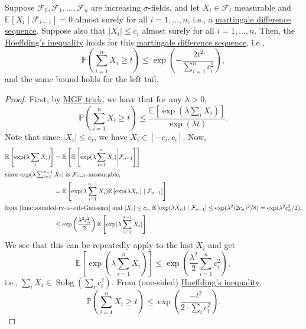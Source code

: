 \begin{theorem}\label{thm:Azuma-Hoeffding-inequality}
	Suppose \(\mathcal{F} _0, \mathcal{F} _1, \dots , \mathcal{F} _n \) are increasing \(\sigma \)-fields, and let \(X_i \in \mathcal{F} _i\) measurable and \(\mathbb{E}_{}\left[X_i \mid \mathcal{F} _{i-1} \right] = 0\) almost surely for all \(i=1, \dots , n\), i.e., a \hyperref[def:martingale-difference-sequence]{martingale difference sequence}. Suppose also that \(\vert X_i \vert \leq c_i\) almost surely for all \(i = 1, \dots , n\). Then, the \hyperref[thm:Hoeffding-inequality]{Hoeffding's inequality} holds for this \hyperref[def:martingale-difference-sequence]{martingale difference sequence}, i.e.,
	\[
		\mathbb{P} \left( \sum_{i=1}^{n} X_i \geq t \right) \leq \exp(- \frac{2t^2}{\sum_{i=1}^{n} c_i^2}),
	\]
	and the same bound holds for the left tail.
\end{theorem}
\begin{proof}
	First, by \hyperref[lma:MGF-trick]{MGF trick}, we have that for any \(\lambda >0\),
	\[
		\mathbb{P} \left( \sum_{i=1}^{n} X_i \geq t \right)
		\leq \frac{\mathbb{E}_{}\left[\exp (\lambda \sum_{i} X_i) \right] }{\exp (\lambda t)}.
	\]
	Note that since \(\vert X_i \vert \leq c_i\), we have \(X_i \in [- c_i, c_i]\). Now,
	\begin{align*}
		\mathbb{E}_{}\left[\exp (\lambda \sum_{i} X_i) \right]
		 & = \mathbb{E}_{}\left[\mathbb{E}_{}\left[\exp (\lambda \sum_{i=1}^n X_i ) \middle| \mathcal{F} _{n-1} \right]  \right]                  \\
		\shortintertext{since \(\exp (\lambda \sum_{i=1}^{n-1} X_i )\) is \(\mathcal{F} _{n-1}\)-measurable,}
		 & = \mathbb{E}_{}\left[\exp (\lambda \sum_{i=1}^{n-1} X_i) \mathbb{E}_{}\left[\exp (\lambda X_n) \mid \mathcal{F} _{n-1} \right] \right] \\
		\shortintertext{from \autoref{lma:bounded-rv-is-sub-Gaussian} and \(\vert X_i \vert \leq c_i\), \(\mathbb{E}_{}\left[\exp (\lambda X_n) \mid \mathcal{F} _{n-1} \right] \leq \exp (\lambda ^2 (2c_n)^2 / 8) = \exp (\lambda ^2 c_n^2 / 2)\),}
		 & \leq \exp \left( \frac{\lambda ^2 c_n^2}{2} \right) \mathbb{E}_{}\left[\exp (\lambda \sum_{i=1}^{n-1} X_i) \right].
	\end{align*}
	We see that this can be repeatedly apply to the last \(X_i\) and get
	\[
		\mathbb{E}_{}\left[\exp (\lambda \sum_{i=1}^{n} X_i) \right]
		\leq \exp \left( \frac{\lambda ^2}{2}\sum_{i=1}^{n} c_i^2 \right),
	\]
	i.e., \(\sum_{i} X_i\in \mathop{\mathrm{Subg}}(\sum_{i} c_i^2) \). From (one-sided) \hyperref[thm:Hoeffding-inequality]{Hoeffding's inequality},
	\[
		\mathbb{P} \left( \sum_{i=1}^{n} X_i \geq t \right)
		\leq \exp \left( \frac{-t^2}{2\cdot \sum_{i} c_i^2} \right).
	\]
\end{proof}

